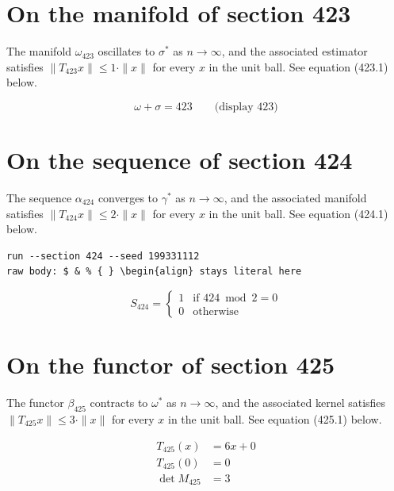 \documentclass{article}
\begin{document}
\section{On the manifold of section 423}
The manifold $\omega_{423}$ oscillates to $\sigma^{*}$ as $n \to \infty$,
and the associated estimator satisfies $\|T_{423} x\| \leq 1 \cdot \|x\|$
for every $x$ in the unit ball. See equation (423.1) below.

$$
\omega + \sigma = 423 \qquad \text{(display 423)}
$$

\section{On the sequence of section 424}
The sequence $\alpha_{424}$ converges to $\gamma^{*}$ as $n \to \infty$,
and the associated manifold satisfies $\|T_{424} x\| \leq 2 \cdot \|x\|$
for every $x$ in the unit ball. See equation (424.1) below.

\begin{verbatim}
run --section 424 --seed 199331112
raw body: $ & % { } \begin{align} stays literal here
\end{verbatim}

\begin{equation}
S_{424} = \begin{cases} 1 & \text{if } 424 \bmod 2 = 0 \\ 0 & \text{otherwise} \end{cases}
\end{equation}

\section{On the functor of section 425}
The functor $\beta_{425}$ contracts to $\omega^{*}$ as $n \to \infty$,
and the associated kernel satisfies $\|T_{425} x\| \leq 3 \cdot \|x\|$
for every $x$ in the unit ball. See equation (425.1) below.

\begin{align}
T_{425}(x) &= 6 x + 0 \\
T_{425}(0) &= 0 \\
\det M_{425} &= 3
\end{align}
\end{document}
